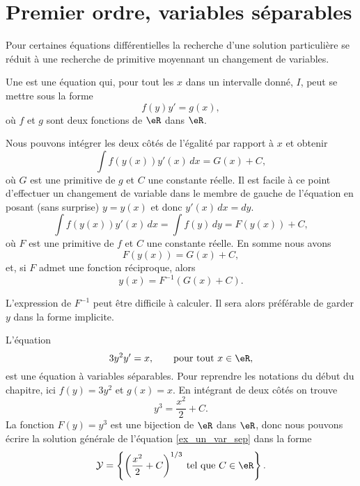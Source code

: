 \section{Premier ordre, variables séparables}

Pour certaines équations différentielles la recherche d'une solution particulière se réduit à une recherche de primitive moyennant un changement de variables.
\begin{definition}
	Une   est une équation qui, pour tout les \(x\) dans un intervalle donné, \(I\), peut se mettre sous la forme
	\begin{equation}\label{eq_var_sep}
		f(y)y' = g(x),
	\end{equation}
	o\`u \(f\) et \(g\) sont deux fonctions de \(\eR\) dans \(\eR\).
\end{definition}
Nous pouvons intégrer les deux côtés de l'égalité par rapport à \(x\) et obtenir
\[
	\int f(y(x))y'(x)\, dx = G(x)+C,
\]
o\`u $G$ est une primitive de $g$ et $C$ une constante réelle. Il est facile \`a ce point d'effectuer un changement de variable dans le membre de gauche de l'équation en posant (sans surprise) \(y= y(x)\) et donc \(y'(x)\,dx = dy\).
\[
	\int f(y(x))y'(x)\, dx =  \int f(y)\, dy  = F(y(x)) + C ,
\]
o\`u $F$ est une primitive de $f$ et $C$ une constante réelle. En somme nous avons
\[
	F(y(x)) = G(x) + C ,
\]
et, si $F$ admet une fonction réciproque, alors
\begin{equation}
	y(x) = F^{-1} (G(x)+C).
\end{equation}
\begin{remark}
	L'expression de $F^{-1} $ peut être difficile à calculer. Il sera alors préférable de garder $y$ dans la forme implicite.
\end{remark}

\begin{example}
	L'équation
	\begin{equation}\label{ex_un_var_sep}
		3y^2 y' = x, \qquad\text{pour tout } x\in\eR,
	\end{equation}
	est une équation à variables séparables. Pour reprendre les notations du début du chapitre, ici \(f(y) = 3y^2\) et \(g(x) = x\). En intégrant de deux côtés on trouve
	\[
		y^3 = \frac{x^2}{2} + C .
	\]
	La fonction $F(y) = y^3$ est une bijection de $\eR$ dans $\eR$, donc nous pouvons écrire la solution générale de l'équation \eqref{ex_un_var_sep} dans la forme
	\[
		\mathcal{Y} =\left\{ \left(\frac{x^2}{2} + C \right)^{1/3} \:\text{tel que } C\in\eR\right\}.
	\]
\end{example}


